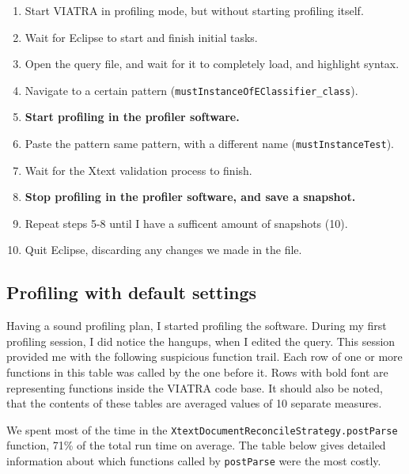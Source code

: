 \documentclass[11pt,a4paper,oneside]{report}
\begin{document}
\begin{enumerate}
    \item{Start VIATRA in profiling mode, but without starting profiling itself.}
    \item{Wait for Eclipse to start and finish initial tasks.}
    \item{Open the query file, and wait for it to completely load, and highlight syntax.}
    \item{Navigate to a certain pattern (\texttt{mustInstanceOfEClassifier\_class}).}
    \item{\textbf{Start profiling in the profiler software.}}
    \item{Paste the pattern same pattern, with a different name (\texttt{mustInstanceTest}).}
    \item{Wait for the Xtext validation process to finish.}
    \item{\textbf{Stop profiling in the profiler software, and save a snapshot.}}
    \item{Repeat steps 5-8 until I have a sufficent amount of snapshots (10).}
    \item{Quit Eclipse, discarding any changes we made in the file.}
\end{enumerate}

\subsection{Profiling with default settings}
Having a sound profiling plan, I started profiling the software. During my
first profiling session, I did notice the hangups, when I edited the query. This
session provided me with the following suspicious function trail. Each row of
one or more functions in this table was called by the one before it. Rows with
bold font are representing functions inside the VIATRA code base. It should also
be noted, that the contents of these tables are averaged values of 10 separate
measures.

We spent most of the time in the
\texttt{XtextDocumentReconcileStrategy.postParse} function, 71\% of the total
run time on average. The table below gives detailed information about which
functions called by \texttt{postParse} were the most costly.
\end{document}
